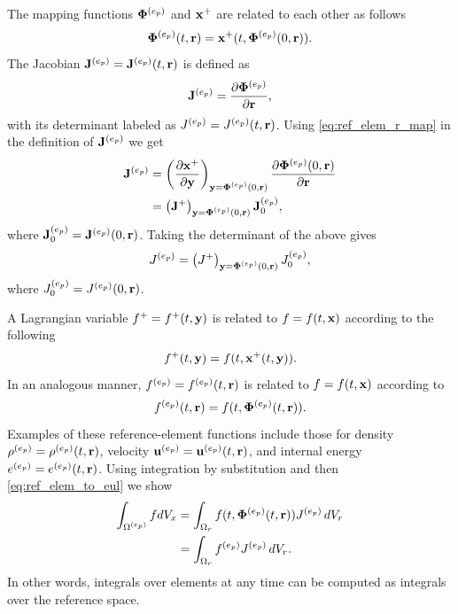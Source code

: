 \documentclass[11pt]{report}
\begin{document}
The mapping functions $\bm \Phi^{(e_p)}$ and $\mathbf{x}^+$ are related to each other as follows
\begin{equation}
    \label{eq:ref_elem_r_map}
    \bm \Phi^{(e_p)}(t,\mathbf{r}) = \mathbf{x}^+(t, \bm \Phi^{(e_p)}(0,\mathbf{r})).
\end{equation}
The Jacobian $\mathbf{J}^{(e_p)} = \mathbf{J}^{(e_p)}(t,\mathbf{r})$ is defined as 
\begin{equation}
    \mathbf{J}^{(e_p)} = \frac{ \partial \bm \Phi^{(e_p)} }{ \partial \mathbf{r} },
\end{equation}
with its determinant labeled as $J^{(e_p)} = J^{(e_p)}(t,\mathbf{r})$. Using \cref{eq:ref_elem_r_map} in the definition of $\mathbf{J}^{(e_p)}$ we get
\begin{align}
    \mathbf{J}^{(e_p)} &= \left ( \frac{\partial \mathbf{x}^+}{\partial \mathbf{y}} \right )_{\mathbf{y} = \bm \Phi^{(e_p)}(0,\mathbf{r})} \frac{\partial \bm \Phi^{(e_p)}(0,\mathbf{r})}{\partial \mathbf{r}} \nonumber \\
    &= \left ( \mathbf{J}^+ \right )_{\mathbf{y} = \bm \Phi^{(e_p)}(0,\mathbf{r})} \mathbf{J}^{(e_p)}_0,
\end{align}
where $\mathbf{J}^{(e_p)}_0 = \mathbf{J}^{(e_p)}(0,\mathbf{r})$.
Taking the determinant of the above gives
\begin{equation}
    \label{eq:ref_elem_det_J}
    J^{(e_p)} = \left ( J^+ \right )_{\mathbf{y} = \bm \Phi^{(e_p)}(0,\mathbf{r})} J^{(e_p)}_0,
\end{equation}
where $J^{(e_p)}_0 = J^{(e_p)}(0,\mathbf{r})$.

A Lagrangian variable $f^+=f^+(t,\mathbf{y})$ is related to $f=f(t,\mathbf{x})$ according to the following
\begin{equation}
    f^+(t,\mathbf{y}) = f(t,\mathbf{x}^+(t,\mathbf{y})).
\end{equation}
In an analogous manner, $f^{(e_p)}=f^{(e_p)}(t,\mathbf{r})$ is related to $f=f(t,\mathbf{x})$ according to
\begin{equation}
    \label{eq:ref_elem_to_eul}
    f^{(e_p)}(t,\mathbf{r}) = f(t,\bm \Phi^{(e_p)}(t,\mathbf{r})).
\end{equation}
Examples of these reference-element functions include those for density $\rho^{(e_p)} = \rho^{(e_p)}(t,\mathbf{r})$, velocity $\mathbf{u}^{(e_p)} = \mathbf{u}^{(e_p)}(t,\mathbf{r})$, and internal energy $e^{(e_p)} = e^{(e_p)}(t,\mathbf{r})$. Using integration by substitution and then \cref{eq:ref_elem_to_eul} we show 
\begin{align}
    \int_{\Omega^{(e_p)}} f dV_x &= \int_{\Omega_r} f(t, \bm \Phi^{(e_p)}(t,\mathbf{r})) J^{(e_p)} \, dV_r \nonumber \\
    &= \int_{\Omega_r} f^{(e_p)} J^{(e_p)} \, dV_r.
\end{align}
In other words, integrals over elements at any time can be computed as integrals over the reference space. 
\end{document}
